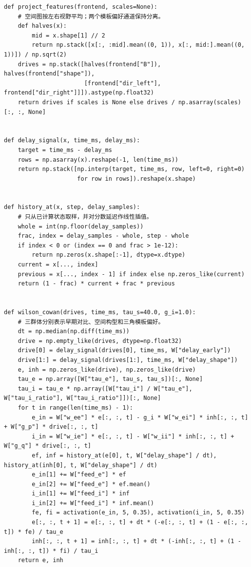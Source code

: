 \begin{appendices}
\begin{lstlisting}[style=appendixPython]
def project_features(frontend, scales=None):
    # 空间图按左右视野平均；两个模板偏好通道保持分离。
    def halves(x):
        mid = x.shape[1] // 2
        return np.stack([x[:, :mid].mean((0, 1)), x[:, mid:].mean((0, 1))]) / np.sqrt(2)
    drives = np.stack([halves(frontend["B"]), halves(frontend["shape"]),
                       [frontend["dir_left"], frontend["dir_right"]]]).astype(np.float32)
    return drives if scales is None else drives / np.asarray(scales)[:, :, None]


def delay_signal(x, time_ms, delay_ms):
    target = time_ms - delay_ms
    rows = np.asarray(x).reshape(-1, len(time_ms))
    return np.stack([np.interp(target, time_ms, row, left=0, right=0)
                     for row in rows]).reshape(x.shape)


def history_at(x, step, delay_samples):
    # 只从已计算状态取样，并对分数延迟作线性插值。
    whole = int(np.floor(delay_samples))
    frac, index = delay_samples - whole, step - whole
    if index < 0 or (index == 0 and frac > 1e-12):
        return np.zeros(x.shape[:-1], dtype=x.dtype)
    current = x[..., index]
    previous = x[..., index - 1] if index else np.zeros_like(current)
    return (1 - frac) * current + frac * previous


def wilson_cowan(drives, time_ms, tau_s=40.0, g_i=1.0):
    # 三群体分别表示早期对比、空间构型和三角模板偏好。
    dt = np.median(np.diff(time_ms))
    drive = np.empty_like(drives, dtype=np.float32)
    drive[0] = delay_signal(drives[0], time_ms, W["delay_early"])
    drive[1:] = delay_signal(drives[1:], time_ms, W["delay_shape"])
    e, inh = np.zeros_like(drive), np.zeros_like(drive)
    tau_e = np.array([W["tau_e"], tau_s, tau_s])[:, None]
    tau_i = tau_e * np.array([W["tau_i"] / W["tau_e"], W["tau_i_ratio"], W["tau_i_ratio"]])[:, None]
    for t in range(len(time_ms) - 1):
        e_in = W["w_ee"] * e[:, :, t] - g_i * W["w_ei"] * inh[:, :, t] + W["g_p"] * drive[:, :, t]
        i_in = W["w_ie"] * e[:, :, t] - W["w_ii"] * inh[:, :, t] + W["g_q"] * drive[:, :, t]
        ef, inf = history_at(e[0], t, W["delay_shape"] / dt), history_at(inh[0], t, W["delay_shape"] / dt)
        e_in[1] += W["feed_e"] * ef
        e_in[2] += W["feed_e"] * ef.mean()
        i_in[1] += W["feed_i"] * inf
        i_in[2] += W["feed_i"] * inf.mean()
        fe, fi = activation(e_in, 5, 0.35), activation(i_in, 5, 0.35)
        e[:, :, t + 1] = e[:, :, t] + dt * (-e[:, :, t] + (1 - e[:, :, t]) * fe) / tau_e
        inh[:, :, t + 1] = inh[:, :, t] + dt * (-inh[:, :, t] + (1 - inh[:, :, t]) * fi) / tau_i
    return e, inh



\end{lstlisting}
\end{appendices}
